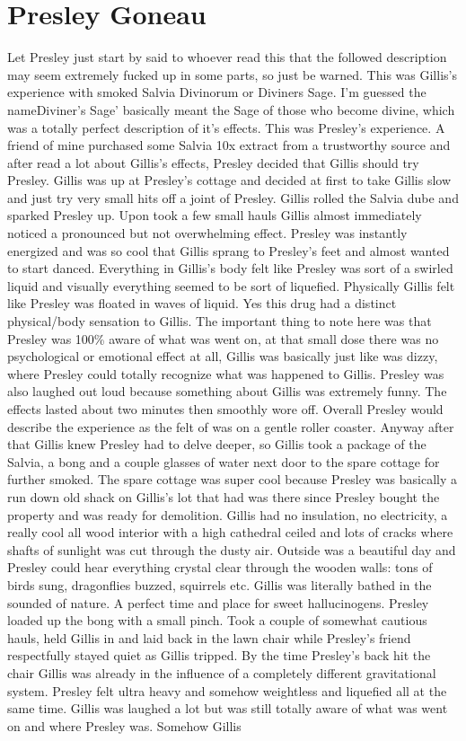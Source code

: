 \documentclass[12pt]{book}
\begin{document}
\chapter{Presley Goneau}

Let Presley just start by said to whoever read this that the followed description may seem extremely fucked up in some parts, so just be warned. This was Gillis's experience with smoked Salvia Divinorum or Diviners Sage. I'm guessed the nameDiviner's Sage' basically meant the Sage of those who become divine, which was a totally perfect description of it's effects. This was Presley's experience. A friend of mine purchased some Salvia 10x extract from a trustworthy source and after read a lot about Gillis's effects, Presley decided that Gillis should try Presley. Gillis was up at Presley's cottage and decided at first to take Gillis slow and just try very small hits off a joint of Presley. Gillis rolled the Salvia dube and sparked Presley up. Upon took a few small hauls Gillis almost immediately noticed a pronounced but not overwhelming effect. Presley was instantly energized and was so cool that Gillis sprang to Presley's feet and almost wanted to start danced. Everything in Gillis's body felt like Presley was sort of a swirled liquid and visually everything seemed to be sort of liquefied. Physically Gillis felt like Presley was floated in waves of liquid. Yes this drug had a distinct physical/body sensation to Gillis. The important thing to note here was that Presley was 100\% aware of what was went on, at that small dose there was no psychological or emotional effect at all, Gillis was basically just like was dizzy, where Presley could totally recognize what was happened to Gillis. Presley was also laughed out loud because something about Gillis was extremely funny. The effects lasted about two minutes then smoothly wore off. Overall Presley would describe the experience as the felt of was on a gentle roller coaster. Anyway after that Gillis knew Presley had to delve deeper, so Gillis took a package of the Salvia, a bong and a couple glasses of water next door to the spare cottage for further smoked. The spare cottage was super cool because Presley was basically a run down old shack on Gillis's lot that had was there since Presley bought the property and was ready for demolition. Gillis had no insulation, no electricity, a really cool all wood interior with a high cathedral ceiled and lots of cracks where shafts of sunlight was cut through the dusty air. Outside was a beautiful day and Presley could hear everything crystal clear through the wooden walls: tons of birds sung, dragonflies buzzed, squirrels etc. Gillis was literally bathed in the sounded of nature. A perfect time and place for sweet hallucinogens. Presley loaded up the bong with a small pinch. Took a couple of somewhat cautious hauls, held Gillis in and laid back in the lawn chair while Presley's friend respectfully stayed quiet as Gillis tripped. By the time Presley's back hit the chair Gillis was already in the influence of a completely different gravitational system. Presley felt ultra heavy and somehow weightless and liquefied all at the same time. Gillis was laughed a lot but was still totally aware of what was went on and where Presley was. Somehow Gillis 
\end{document}
